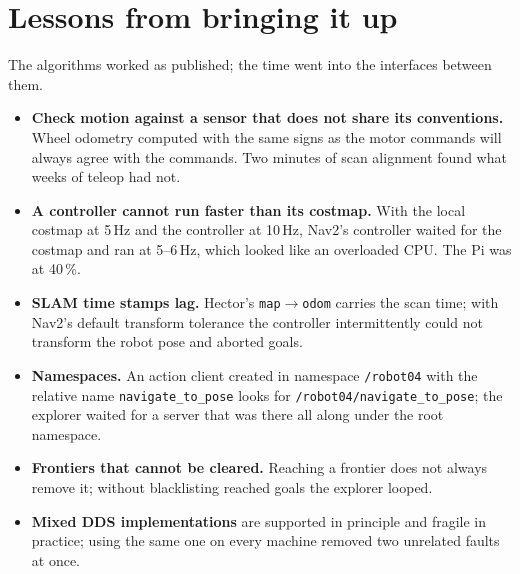 \documentclass[10pt,twocolumn]{article}
\begin{document}
\section{Lessons from bringing it up}\label{sec:lessons}
The algorithms worked as published; the time went into the interfaces between them.
\begin{itemize}
\item \textbf{Check motion against a sensor that does not share its conventions.} Wheel
  odometry computed with the same signs as the motor commands will always agree with the
  commands. Two minutes of scan alignment found what weeks of teleop had not.
\item \textbf{A controller cannot run faster than its costmap.} With the local costmap at 5\,Hz
  and the controller at 10\,Hz, Nav2's controller waited for the costmap and ran at 5--6\,Hz,
  which looked like an overloaded CPU. The Pi was at 40\,\%.
\item \textbf{SLAM time stamps lag.} Hector's \texttt{map}$\to$\texttt{odom} carries the scan
  time; with Nav2's default transform tolerance the controller intermittently could not
  transform the robot pose and aborted goals.
\item \textbf{Namespaces.} An action client created in namespace \texttt{/robot04} with the
  relative name \texttt{navigate\_to\_pose} looks for \texttt{/robot04/navigate\_to\_pose}; the
  explorer waited for a server that was there all along under the root namespace.
\item \textbf{Frontiers that cannot be cleared.} Reaching a frontier does not always remove it;
  without blacklisting reached goals the explorer looped.
\item \textbf{Mixed DDS implementations} are supported in principle and fragile in practice;
  using the same one on every machine removed two unrelated faults at once.
\end{itemize}
\end{document}
